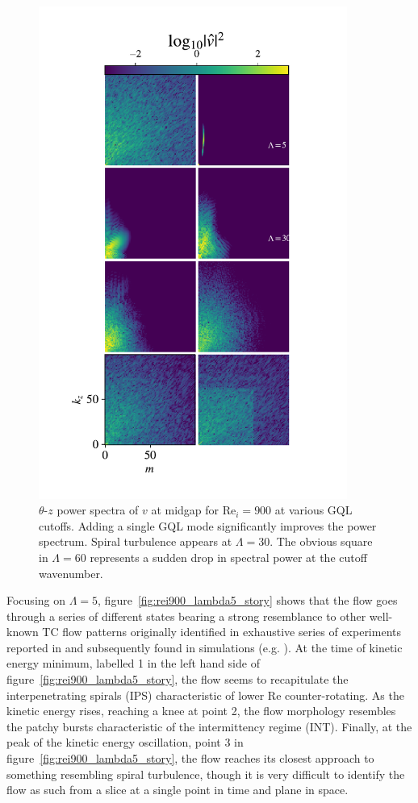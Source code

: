 \documentclass[openacc]{rstransa}%
\newcommand{\Reyn}{\mathrm{Re}}
\begin{document}
\begin{figure}
    \centering
    \includegraphics[width=0.9\textwidth]{../figs/rei900_spectra.pdf}
    \caption{$\theta$-$z$ power spectra of $v$ at midgap for $\Reyn_i = 900$ at various GQL cutoffs. Adding a single GQL mode significantly improves the power spectrum. Spiral turbulence appears at $\Lambda=30$. The obvious square in $\Lambda = 60$ represents a sudden drop in spectral power at the cutoff wavenumber.}
    \label{fig:rei900_spectra}
\end{figure}
Focusing on $\Lambda=5$, figure~\ref{fig:rei900_lambda5_story} shows that the flow goes through a series of different states bearing a strong resemblance to other well-known TC flow patterns originally identified in exhaustive series of experiments reported in \cite{1984JFM...146...45M} and subsequently found in simulations (e.g. \cite{2009PhRvE..80d6315M}). At the time of kinetic energy minimum, labelled 1 in the left hand side of figure~\ref{fig:rei900_lambda5_story}, the flow seems to recapitulate the interpenetrating spirals (IPS) characteristic of lower $\Reyn$ counter-rotating. As the kinetic energy rises, reaching a knee at point 2, the flow morphology resembles the patchy bursts characteristic of the intermittency regime (INT). Finally, at the peak of the kinetic energy oscillation, point 3 in figure~\ref{fig:rei900_lambda5_story}, the flow reaches its closest approach to something resembling spiral turbulence, though it is very difficult to identify the flow as such from a slice at a single point in time and plane in space.
\end{document}
